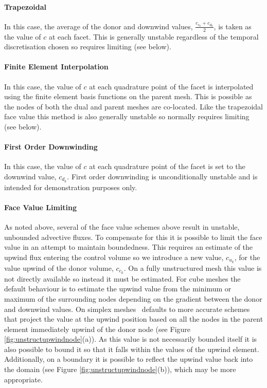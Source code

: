 \paragraph{Trapezoidal} \label{sec:trap}

In this case, the average of the donor and downwind values, $\frac{c_{c_k}+c_{d_k}}{2}$, is taken as the value of $c$ at each facet.  This is generally unstable regardless of the temporal discretisation chosen so requires limiting (see below).

\paragraph{Finite Element Interpolation} \label{sec:cvfe}

In this case, the value of $c$ at each quadrature point of the facet is interpolated using the finite element basis functions on the parent mesh.  This is possible as the nodes of both the dual and parent meshes are co-located.  Like the trapezoidal face value this method is also generally unstable so normally requires limiting (see below).

\paragraph{First Order Downwinding} \label{sec:fod}

In this case, the value of $c$ at each quadrature point of the facet is set to the downwind value, $c_{d_k}$.  First order downwinding is unconditionally unstable and is intended for demonstration purposes only.

\paragraph{Face Value Limiting} \label{sec:cvlimiting}

As noted above, several of the face value schemes above result in unstable, unbounded advective fluxes.  To compensate for this it is possible to limit the face value in an attempt to maintain boundedness.  This requires an estimate of the upwind flux entering the control volume so we introduce a new value, $c_{u_k}$, for the value upwind of the donor volume, $c_{c_k}$.  On a fully unstructured mesh this value is not directly available so instead it must be estimated.  For cube meshes the default behaviour is to estimate the upwind value from the minimum or maximum of the surrounding nodes depending on the gradient between the donor and downwind values.  On simplex meshes \fluidity\ defaults to more accurate schemes that project the value at the upwind position based on all the nodes in the parent element immediately upwind of the donor node (see Figure \ref{fig:unstructupwindnode}(a)).  As this value is not necessarily bounded itself it is also possible to bound it so that it falls within the values of the upwind element.  Additionally, on a boundary it is possible to reflect the upwind value back into the domain (see Figure \ref{fig:unstructupwindnode}(b)), which may be more appropriate.

